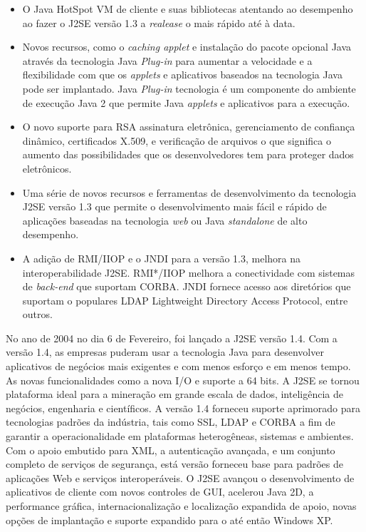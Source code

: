 \begin{itemize}
  \item O Java HotSpot VM de cliente e suas bibliotecas atentando ao desempenho ao fazer o J2SE versão 1.3 a {\it realease} o mais rápido até à data.
  \item Novos recursos, como o {\it caching applet} e instalação do pacote opcional Java através da tecnologia Java {\it  Plug-in} para aumentar a velocidade e a flexibilidade com que os {\it applets} e aplicativos baseados na tecnologia Java pode ser implantado. Java {\it  Plug-in} tecnologia é um componente do ambiente de execução Java 2 que permite Java {\it applets} e aplicativos para a execução.
  \item O novo suporte para RSA assinatura eletrônica, gerenciamento de confiança dinâmico, certificados X.509, e verificação de arquivos o que significa o aumento das possibilidades que os desenvolvedores tem para proteger dados eletrônicos.
  \item Uma série de novos recursos e ferramentas de desenvolvimento da tecnologia J2SE versão 1.3 que permite o desenvolvimento mais fácil e rápido de aplicações baseadas na tecnologia {\it web} ou Java {\it  standalone} de alto desempenho.
  \item A adição de RMI/IIOP e o JNDI para a versão 1.3, melhora na interoperabilidade J2SE. RMI*/IIOP melhora a conectividade com sistemas de {\it  back-end} que suportam CORBA. JNDI fornece acesso aos diretórios que suportam o populares LDAP Lightweight Directory Access Protocol, entre outros.\\
\end{itemize}

No ano de 2004 no dia 6 de Fevereiro, foi lançado a J2SE versão 1.4. Com a versão 1.4, as empresas puderam usar a tecnologia Java para desenvolver aplicativos de negócios mais exigentes e com menos esforço e em menos tempo. As novas funcionalidades como a nova I/O e suporte a 64 bits. A J2SE se tornou plataforma ideal para a mineração em grande escala de dados, inteligência de negócios, engenharia e científicos. A versão 1.4 forneceu suporte aprimorado para tecnologias padrões da indústria, tais como SSL, LDAP e CORBA a fim de garantir a operacionalidade em plataformas heterogêneas, sistemas e ambientes. Com o apoio embutido para XML, a autenticação avançada, e um conjunto completo de serviços de segurança, está versão forneceu base para padrões de aplicações Web e serviços interoperáveis. O J2SE avançou o desenvolvimento de aplicativos de cliente com novos controles de GUI, acelerou Java 2D, a performance gráfica, internacionalização e localização expandida de apoio, novas opções de implantação e suporte expandido para o até então Windows XP.\\

